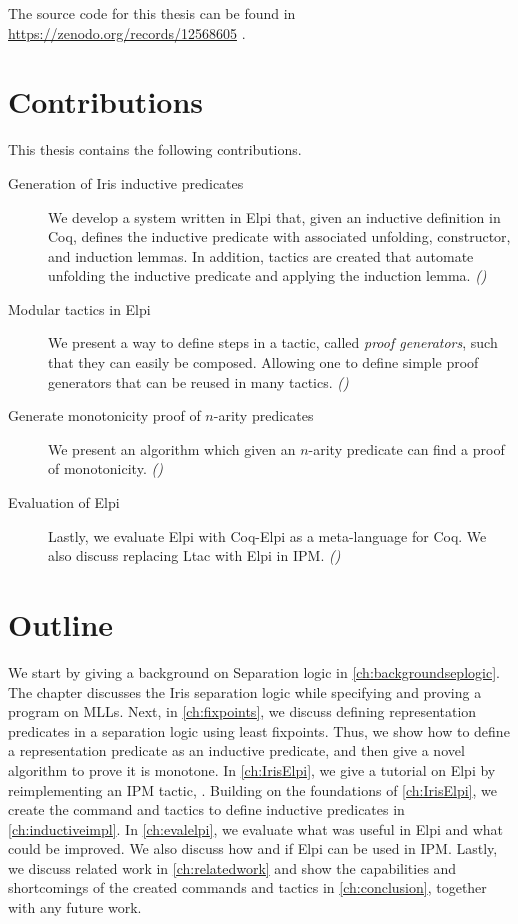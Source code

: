 \documentclass[thesis.tex]{subfiles}
\begin{document}
The source code for this thesis can be found in \url{https://zenodo.org/records/12568605} \cite{Maas2024}.

\section{Contributions}
This thesis contains the following contributions.
\begin{description}
  \item[Generation of Iris inductive predicates] We develop a system written in Elpi that, given an inductive definition in Coq, defines the inductive predicate with associated unfolding, constructor, and induction lemmas. In addition, tactics are created that automate unfolding the inductive predicate and applying the induction lemma. \emph{()}
  \item[Modular tactics in Elpi] We present a way to define steps in a tactic, called \emph{proof generators}, such that they can easily be composed. Allowing one to define simple proof generators that can be reused in many tactics. \emph{()}
  \item[Generate monotonicity proof of $n$-arity predicates] We present an algorithm which given an $n$-arity predicate can find a proof of monotonicity. \emph{()}
  \item[Evaluation of Elpi] Lastly, we evaluate Elpi with Coq-Elpi as a meta-language for Coq. We also discuss replacing Ltac with Elpi in IPM. \emph{()}
\end{description}

\section{Outline}
We start by giving a background on Separation logic in \cref{ch:backgroundseplogic}. The chapter discusses the Iris separation logic while specifying and proving a program on MLLs. Next, in \cref{ch:fixpoints}, we discuss defining representation predicates in a separation logic using least fixpoints. Thus, we show how to define a representation predicate as an inductive predicate, and then give a novel algorithm to prove it is monotone. In \cref{ch:IrisElpi}, we give a tutorial on Elpi by reimplementing an IPM tactic, . Building on the foundations of \cref{ch:IrisElpi}, we create the command and tactics to define inductive predicates in \cref{ch:inductiveimpl}. In \cref{ch:evalelpi}, we evaluate what was useful in Elpi and what could be improved. We also discuss how and if Elpi can be used in IPM. Lastly, we discuss related work in \cref{ch:relatedwork} and show the capabilities and shortcomings of the created commands and tactics in \cref{ch:conclusion}, together with any future work.
\end{document}
